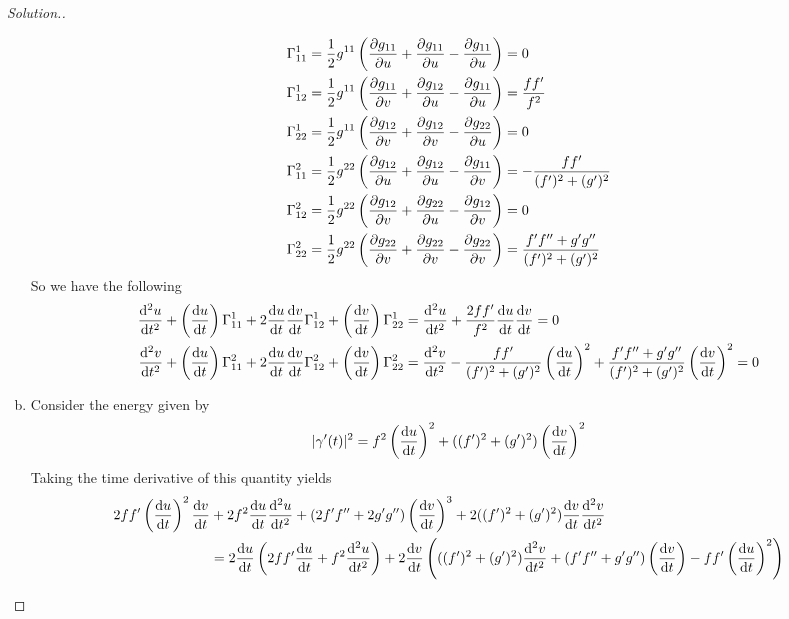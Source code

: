 \documentclass[a4paper]{article}
\begin{document}
\begin{proof}[Solution.]
\begin{enumerate}[a)]
\[\begin{aligned}
          \Gamma^1_{11} &= \frac{1}{2}g^{11} \left(\pdv{g_{11}}{u} + \pdv{g_{11}}{u} - \pdv{g_{11}}{u}  \right) = 0 \\
          \Gamma^1_{12} &= \frac{1}{2}g^{11} \left(\pdv{g_{11}}{v} + \pdv{g_{12}}{u} - \pdv{g_{11}}{u}  \right) = \frac{ff'}{f^2} \\
          \Gamma^1_{22} &= \frac{1}{2}g^{11} \left(\pdv{g_{12}}{v} + \pdv{g_{12}}{v} - \pdv{g_{22}}{u}  \right) = 0 \\
          \Gamma^2_{11} &= \frac{1}{2}g^{22} \left(\pdv{g_{12}}{u} + \pdv{g_{12}}{u} - \pdv{g_{11}}{v}  \right) = -\frac{ff'}{(f')^2 + (g')^2} \\
          \Gamma^2_{12} &= \frac{1}{2}g^{22} \left(\pdv{g_{12}}{v} + \pdv{g_{22}}{u} - \pdv{g_{12}}{v}  \right) = 0 \\
          \Gamma^2_{22} &= \frac{1}{2}g^{22} \left(\pdv{g_{22}}{v} + \pdv{g_{22}}{v} - \pdv{g_{22}}{v}  \right) = \frac{f'f'' + g'g''}{(f')^2 + (g')^2} \\
        \end{aligned}
      \]
      So we have the following 
      \[
        \begin{aligned}
          \dv[2]{u}{t} + \left(\dv{u}{t}\right) \Gamma_{11}^1 + 2\dv{u}{t}\dv{v}{t} \Gamma_{12}^1 + \left(\dv{v}{t}\right)\Gamma_{22}^1 &= \dv[2]{u}{t} + \frac{2ff'}{f^2} \dv{u}{t}\dv{v}{t} = 0 \\
          \dv[2]{v}{t} + \left(\dv{u}{t}\right) \Gamma_{11}^2 + 2\dv{u}{t}\dv{v}{t} \Gamma_{12}^2 + \left(\dv{v}{t}\right)\Gamma_{22}^2 &= \dv[2]{v}{t} - \frac{ff'}{(f')^2 + (g')^2} \left(\dv{u}{t}\right)^2 + \frac{f'f'' + g'g''}{(f')^2 + (g')^2}\left( \dv{v}{t} \right)^2 = 0 \\
        \end{aligned}
      \]
    \item Consider the energy given by
      \[
        |\gamma'(t)|^2 = f^2 \left(\dv{u}{t}\right)^2 + ((f')^2 + (g')^2) \left(\dv{v}{t}\right)^2
      \]
      Taking the time derivative of this quantity yields
      \[
        \begin{aligned}
          2ff' \left( \dv{u}{t} \right)^2 \dv{v}{t} &+ 2 f^2 \dv{u}{t} \dv[2]{u}{t} +  (2f'f'' + 2g'g'') \left(\dv{v}{t}\right)^3  + 2((f')^2 + (g')^2) \dv{v}{t} \dv[2]{v}{t} \\
                                                    &= 2\dv{u}{t}\left( 2 ff' \dv{u}{t} + f^2 \dv[2]{u}{t} \right) + 2\dv{v}{t} \left( ((f')^2 + (g')^2) \dv[2]{v}{t} + (f'f'' + g'g'')\left(\dv{v}{t}\right) - ff' \left(\dv{u}{t}\right)^2 \right) \\

\end{aligned}\]
\end{enumerate}
\end{proof}
\end{document}
